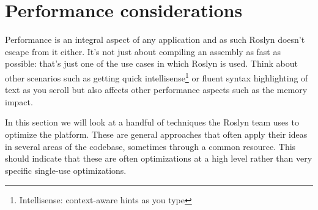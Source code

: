 \newpage
\section{Performance considerations}
\label{sec:performance}

Performance is an integral aspect of any application and as such Roslyn doesn't escape from it either. It's not just about compiling an assembly as fast as possible: that's just one of the use cases in which Roslyn is used. Think about other scenarios such as getting quick \gls{intellisense}\footnote{Intellisense: context-aware hints as you type} or fluent syntax highlighting of text as you scroll but also affects other performance aspects such as the memory impact.

In this section we will look at a handful of techniques the Roslyn team uses to optimize the platform. These are general approaches that often apply their ideas in several areas of the codebase, sometimes through a common resource. This should indicate that these are often optimizations at a high level rather than very specific single-use optimizations. 











